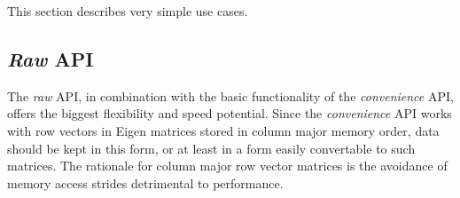 \documentclass[a4paper,10pt]{article}
\begin{document}
This section describes very simple use cases.

\subsection{\emph{Raw} API}
\lstset{language=C++}

The \emph{raw} API, in combination with the basic functionality of the \emph{convenience} API, offers the biggest flexibility and speed potential. Since the \emph{convenience} API works with row vectors in Eigen matrices \cite{eigenweb} stored in column major memory order, data should be kept in this form, or at least in a form easily convertable to such matrices. The rationale for column major row vector matrices is the avoidance of memory access strides detrimental to performance.
\end{document}
